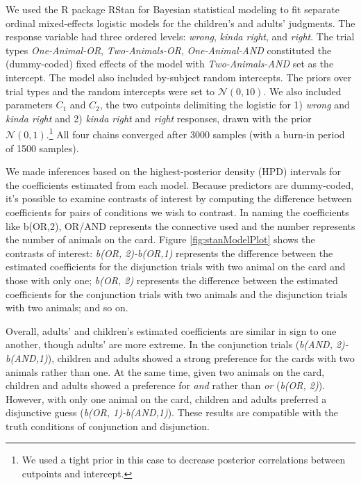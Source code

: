 \documentclass[floatsintext,man]{apa6}
\theoremstyle{definition}
\theoremstyle{definition}
\theoremstyle{definition}
\theoremstyle{remark}
\begin{document}
We used the R package RStan for Bayesian statistical modeling to fit
separate ordinal mixed-effects logistic models for the children's and
adults' judgments. The response variable had three ordered levels:
\emph{wrong}, \emph{kinda right}, and \emph{right}. The trial types
\emph{One-Animal-OR}, \emph{Two-Animals-OR}, \emph{One-Animal-AND}
constituted the (dummy-coded) fixed effects of the model with
\emph{Two-Animals-AND} set as the intercept. The model also included
by-subject random intercepts. The priors over trial types and the random
intercepts were set to \(\mathcal{N}(0,10)\). We also included
parameters \(C_1\) and \(C_2\), the two cutpoints delimiting the
logistic for 1) \emph{wrong} and \emph{kinda right} and 2) \emph{kinda
right} and \emph{right} responses, drawn with the prior
\(\mathcal{N}(0,1)\).\footnote{We used a tight prior in this case to
  decrease posterior correlations between cutpoints and intercept.} All
four chains converged after 3000 samples (with a burn-in period of 1500
samples).

We made inferences based on the highest-posterior density (HPD)
intervals for the coefficients estimated from each model. Because
predictors are dummy-coded, it's possible to examine contrasts of
interest by computing the difference between coefficients for pairs of
conditions we wish to contrast. In naming the coefficients like b(OR,2),
OR/AND represents the connective used and the number represents the
number of animals on the card. Figure \ref{fig:stanModelPlot} shows the
contrasts of interest: \emph{b(OR, 2)-b(OR,1)} represents the difference
between the estimated coefficients for the disjunction trials with two
animal on the card and those with only one; \emph{b(OR, 2)} represents
the difference between the estimated coefficients for the conjunction
trials with two animals and the disjunction trials with two animals; and
so on.

Overall, adults' and children's estimated coefficients are similar in
sign to one another, though adults' are more extreme. In the conjunction
trials (\emph{b(AND, 2)-b(AND,1)}), children and adults showed a strong
preference for the cards with two animals rather than one. At the same
time, given two animals on the card, children and adults showed a
preference for \emph{and} rather than \emph{or} (\emph{b(OR, 2)}).
However, with only one animal on the card, children and adults preferred
a disjunctive guess (\emph{b(OR, 1)-b(AND,1)}). These results are
compatible with the truth conditions of conjunction and disjunction.
\end{document}
